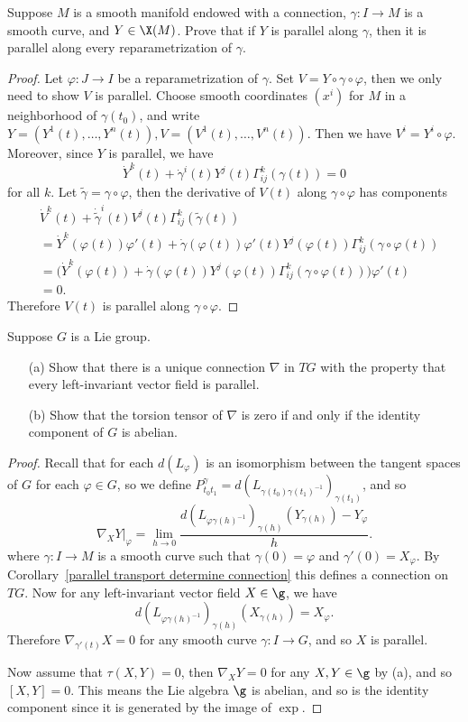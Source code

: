 \begin{exercise}
Suppose $M$ is a smooth manifold endowed with a connection, $\gamma:I\to M$ is a smooth curve, 
and $Y\in\X(M)$. Prove that if $Y$ is parallel along $\gamma$, then it is parallel along every reparametrization of $\gamma$.
\end{exercise}
\begin{proof}
Let $\varphi:J\to I$ be a reparametrization of $\gamma$. Set $V=Y\circ\gamma\circ\varphi$, then we only need to show $V$ is parallel. Choose smooth coordinates 
$(x^i)$ for $M$ in a neighborhood of $\gamma(t_0)$, and write $Y=(Y^1(t),\dots,Y^n(t)),V=(V^1(t),\dots,V^n(t))$. Then we have $V^i=Y^i\circ\varphi$. 
Moreover, since $Y$ is parallel, we have
\[\dot{Y}^k(t)+\dot{\gamma}^i(t)Y^j(t)\Gamma_{ij}^k(\gamma(t))=0\]
for all $k$. Let $\tilde{\gamma}=\gamma\circ\varphi$, then the derivative of $V(t)$ along $\gamma\circ\varphi$ has components
\begin{align*}
&\dot{V}^k(t)+\dot{\tilde{\gamma}}^i(t)V^j(t)\Gamma_{ij}^k(\tilde{\gamma}(t))\\
&=\dot{Y}^k(\varphi(t))\varphi'(t)+\dot{\gamma}(\varphi(t))\varphi'(t)Y^j(\varphi(t))\Gamma_{ij}^k(\gamma\circ\varphi(t))\\
&=\big(\dot{Y}^k(\varphi(t))+\dot{\gamma}(\varphi(t))Y^j(\varphi(t))\Gamma_{ij}^k(\gamma\circ\varphi(t))\big)\varphi'(t)\\
&=0.
\end{align*}
Therefore $V(t)$ is parallel along $\gamma\circ\varphi$.
\end{proof}
\begin{exercise}
Suppose $G$ is a Lie group.
\begin{itemize}
\item[(a)] Show that there is a unique connection $\nabla$ in $TG$ with the property that every left-invariant vector field is parallel.
\item[(b)] Show that the torsion tensor of $\nabla$ is zero if and only if the identity component of $G$ is abelian.
\end{itemize}
\end{exercise}
\begin{proof}
Recall that for each $d(L_{\varphi})$ is an isomorphism between the tangent spaces of $G$ for each $\varphi\in G$, so we define $P^\gamma_{t_0t_1}=d(L_{\gamma(t_0)\gamma(t_1)^{-1}})_{\gamma(t_1)}$, and so
\[\nabla_XY|_\varphi=\lim_{h\to 0}\frac{d(L_{\varphi\gamma(h)^{-1}})_{\gamma(h)}(Y_{\gamma(h)})-Y_{\varphi}}{h}.\]
where $\gamma:I\to M$ is a smooth curve such that $\gamma(0)=\varphi$ and $\gamma'(0)=X_\varphi$. By Corollary~\ref{parallel transport determine connection} this defines a 
connection on $TG$. Now for any left-invariant vector field $X\in\g$, we have
\[d(L_{\varphi\gamma(h)^{-1}})_{\gamma(h)}(X_{\gamma(h)})=X_{\varphi}.\]
Therefore $\nabla_{\gamma'(t)}X=0$ for any smooth curve $\gamma:I\to G$, and so $X$ is parallel.\par
Now assume that $\tau(X,Y)=0$, then $\nabla_XY=0$ for any $X,Y\in\g$ by (a), and so $[X,Y]=0$. This means the Lie algebra $\g$ is abelian, and so is the identity component since 
it is generated by the image of $\exp$.
\end{proof}
